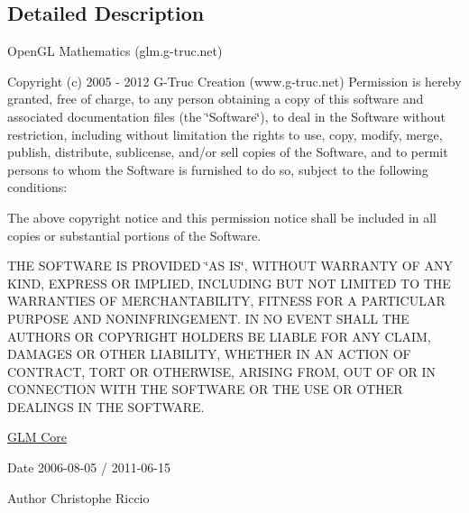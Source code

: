 \subsection{\-Detailed \-Description}
\-Open\-G\-L \-Mathematics (glm.\-g-\/truc.\-net)

\-Copyright (c) 2005 -\/ 2012 \-G-\/\-Truc \-Creation (www.\-g-\/truc.\-net) \-Permission is hereby granted, free of charge, to any person obtaining a copy of this software and associated documentation files (the \char`\"{}\-Software\char`\"{}), to deal in the \-Software without restriction, including without limitation the rights to use, copy, modify, merge, publish, distribute, sublicense, and/or sell copies of the \-Software, and to permit persons to whom the \-Software is furnished to do so, subject to the following conditions\-:

\-The above copyright notice and this permission notice shall be included in all copies or substantial portions of the \-Software.

\-T\-H\-E \-S\-O\-F\-T\-W\-A\-R\-E \-I\-S \-P\-R\-O\-V\-I\-D\-E\-D \char`\"{}\-A\-S I\-S\char`\"{}, \-W\-I\-T\-H\-O\-U\-T \-W\-A\-R\-R\-A\-N\-T\-Y \-O\-F \-A\-N\-Y \-K\-I\-N\-D, \-E\-X\-P\-R\-E\-S\-S \-O\-R \-I\-M\-P\-L\-I\-E\-D, \-I\-N\-C\-L\-U\-D\-I\-N\-G \-B\-U\-T \-N\-O\-T \-L\-I\-M\-I\-T\-E\-D \-T\-O \-T\-H\-E \-W\-A\-R\-R\-A\-N\-T\-I\-E\-S \-O\-F \-M\-E\-R\-C\-H\-A\-N\-T\-A\-B\-I\-L\-I\-T\-Y, \-F\-I\-T\-N\-E\-S\-S \-F\-O\-R \-A \-P\-A\-R\-T\-I\-C\-U\-L\-A\-R \-P\-U\-R\-P\-O\-S\-E \-A\-N\-D \-N\-O\-N\-I\-N\-F\-R\-I\-N\-G\-E\-M\-E\-N\-T. \-I\-N \-N\-O \-E\-V\-E\-N\-T \-S\-H\-A\-L\-L \-T\-H\-E \-A\-U\-T\-H\-O\-R\-S \-O\-R \-C\-O\-P\-Y\-R\-I\-G\-H\-T \-H\-O\-L\-D\-E\-R\-S \-B\-E \-L\-I\-A\-B\-L\-E \-F\-O\-R \-A\-N\-Y \-C\-L\-A\-I\-M, \-D\-A\-M\-A\-G\-E\-S \-O\-R \-O\-T\-H\-E\-R \-L\-I\-A\-B\-I\-L\-I\-T\-Y, \-W\-H\-E\-T\-H\-E\-R \-I\-N \-A\-N \-A\-C\-T\-I\-O\-N \-O\-F \-C\-O\-N\-T\-R\-A\-C\-T, \-T\-O\-R\-T \-O\-R \-O\-T\-H\-E\-R\-W\-I\-S\-E, \-A\-R\-I\-S\-I\-N\-G \-F\-R\-O\-M, \-O\-U\-T \-O\-F \-O\-R \-I\-N \-C\-O\-N\-N\-E\-C\-T\-I\-O\-N \-W\-I\-T\-H \-T\-H\-E \-S\-O\-F\-T\-W\-A\-R\-E \-O\-R \-T\-H\-E \-U\-S\-E \-O\-R \-O\-T\-H\-E\-R \-D\-E\-A\-L\-I\-N\-G\-S \-I\-N \-T\-H\-E \-S\-O\-F\-T\-W\-A\-R\-E.

\hyperlink{group__core}{\-G\-L\-M \-Core}

\begin{DoxyDate}{\-Date}
2006-\/08-\/05 / 2011-\/06-\/15 
\end{DoxyDate}
\begin{DoxyAuthor}{\-Author}
\-Christophe \-Riccio 
\end{DoxyAuthor}
